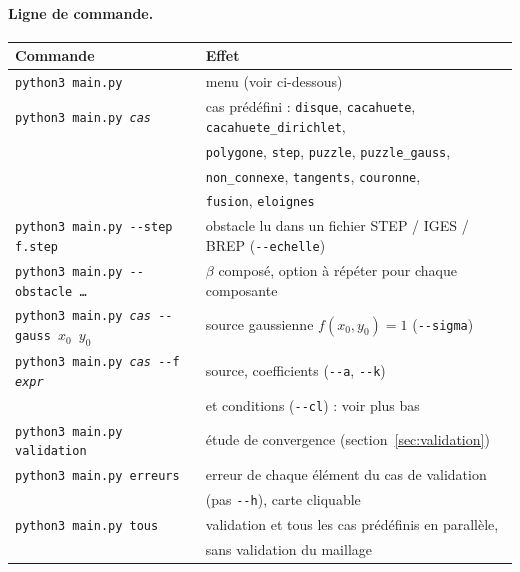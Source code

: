 \documentclass[11pt,a4paper]{article}
\begin{document}
\paragraph{Ligne de commande.}
\begin{center}
\begin{tabular}{ll}
\hline
Commande & Effet \\
\hline
\texttt{python3 main.py} & menu (voir ci-dessous) \\
\texttt{python3 main.py \textit{cas}} & cas prédéfini : \texttt{disque}, \texttt{cacahuete},
                                        \texttt{cacahuete\_dirichlet}, \\
                                      & \texttt{polygone}, \texttt{step}, \texttt{puzzle},
                                        \texttt{puzzle\_gauss}, \\
                                      & \texttt{non\_connexe}, \texttt{tangents}, \texttt{couronne}, \\
                                      & \texttt{fusion}, \texttt{eloignes} \\
\texttt{python3 main.py -{}-step f.step} & obstacle lu dans un fichier STEP / IGES / BREP
                                         (\texttt{-{}-echelle}) \\
\texttt{python3 main.py -{}-obstacle \dots} & $\beta$ composé, option à répéter
                                            pour chaque composante \\
\texttt{python3 main.py \textit{cas} -{}-gauss $x_0$ $y_0$} & source gaussienne
                                        $f(x_0, y_0) = 1$ (\texttt{-{}-sigma}) \\
\texttt{python3 main.py \textit{cas} -{}-f \textit{expr}} & source, coefficients (\texttt{-{}-a}, \texttt{-{}-k}) \\
                                        & et conditions (\texttt{-{}-cl}) : voir plus bas \\
\texttt{python3 main.py validation} & étude de convergence (section~\ref{sec:validation}) \\
\texttt{python3 main.py erreurs} & erreur de chaque élément du cas de validation \\
                                  & (pas \texttt{-{}-h}), carte cliquable \\
\texttt{python3 main.py tous} & validation et tous les cas prédéfinis en parallèle, \\
                              & sans validation du maillage \\
\hline
\end{tabular}
\end{center}
\end{document}
